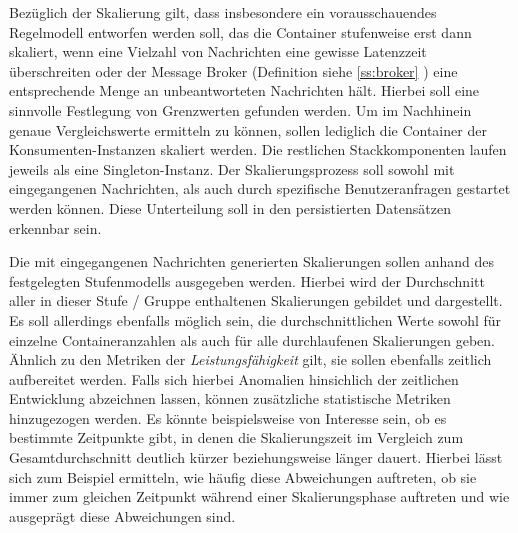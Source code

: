 Bezüglich der Skalierung gilt, dass insbesondere ein vorausschauendes Regelmodell entworfen werden soll, das die Container stufenweise erst dann skaliert, wenn eine Vielzahl von Nachrichten eine gewisse Latenzzeit überschreiten oder der Message Broker (Definition siehe \ref{ss:broker} ) eine entsprechende Menge an unbeantworteten Nachrichten hält. Hierbei soll eine sinnvolle Festlegung von Grenzwerten gefunden werden. Um im Nachhinein genaue Vergleichswerte ermitteln zu können, sollen lediglich die Container der Konsumenten-Instanzen skaliert werden. Die restlichen Stackkomponenten laufen jeweils als eine Singleton-Instanz. Der Skalierungsprozess soll sowohl mit eingegangenen Nachrichten, als auch durch spezifische Benutzeranfragen gestartet werden können. Diese Unterteilung soll in den persistierten Datensätzen erkennbar sein.

Die mit eingegangenen Nachrichten generierten Skalierungen sollen anhand des festgelegten Stufenmodells ausgegeben werden. Hierbei wird der Durchschnitt aller in dieser Stufe / Gruppe enthaltenen Skalierungen gebildet und dargestellt. Es soll allerdings ebenfalls möglich sein, die durchschnittlichen Werte sowohl für einzelne Containeranzahlen als auch für alle durchlaufenen Skalierungen geben. Ähnlich zu den Metriken der \emph{Leistungsfähigkeit} gilt, sie sollen ebenfalls zeitlich aufbereitet werden. Falls sich hierbei Anomalien hinsichlich der zeitlichen Entwicklung abzeichnen lassen, können zusätzliche statistische Metriken hinzugezogen werden. Es könnte beispielsweise von Interesse sein, ob es bestimmte Zeitpunkte gibt, in denen die Skalierungszeit im Vergleich zum Gesamtdurchschnitt deutlich kürzer beziehungsweise länger dauert. Hierbei lässt sich zum Beispiel ermitteln, wie häufig diese Abweichungen auftreten, ob sie immer zum gleichen Zeitpunkt während einer Skalierungsphase auftreten und wie ausgeprägt diese Abweichungen sind.

